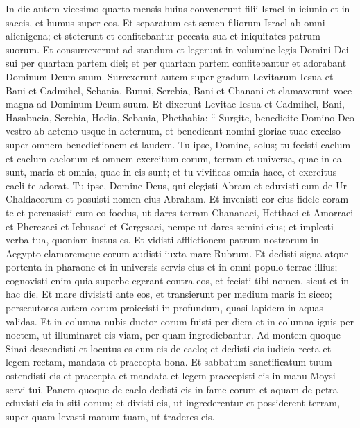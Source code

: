 \begin{biblechapter}
\begin{biblechapter}
\begin{biblechapter}
\begin{biblechapter}
\begin{biblechapter}
\begin{biblechapter}
\begin{biblechapter}
\begin{biblechapter}
\begin{biblechapter}
\verse In die autem vicesimo quarto mensis huius convenerunt filii Israel in ieiunio et in saccis, et humus super eos. 
\verse Et separatum est semen filiorum Israel ab omni alienigena; et steterunt et confitebantur peccata sua et iniquitates patrum suorum. 
\verse Et consurrexerunt ad standum et legerunt in volumine legis Domini Dei sui per quartam partem diei; et per quartam partem confitebantur et adorabant Dominum Deum suum. 
\verse Surrexerunt autem super gradum Levitarum Iesua et Bani et Cadmihel, Sebania, Bunni, Serebia, Bani et Chanani et clamaverunt voce magna ad Dominum Deum suum. 
\verse Et dixerunt Levitae Iesua et Cadmihel, Bani, Hasabneia, Serebia, Hodia, Sebania, Phethahia:
 “ Surgite, benedicite Domino Deo vestro
 ab aetemo usque in aeternum,
 et benedicant nomini gloriae tuae excelso
 super omnem benedictionem et laudem.
 \verse Tu ipse, Domine, solus;
 tu fecisti caelum et caelum caelorum
 et omnem exercitum eorum,
 terram et universa, quae in ea sunt, maria et omnia, quae in eis sunt;
 et tu vivificas omnia haec,
 et exercitus caeli te adorat.
 \verse Tu ipse, Domine Deus, qui elegisti Abram
 et eduxisti eum de Ur Chaldaeorum
 et posuisti nomen eius Abraham.
 \verse Et invenisti cor eius fidele coram te
 et percussisti cum eo foedus,
 ut dares terram Chananaei, Hetthaei et Amorraei
 et Pherezaei et Iebusaei et Gergesaei,
 nempe ut dares semini eius;
 et implesti verba tua,
 quoniam iustus es.
 \verse Et vidisti afflictionem patrum nostrorum in Aegypto
 clamoremque eorum audisti iuxta mare Rubrum.
 \verse Et dedisti signa atque portenta in pharaone
 et in universis servis eius et in omni populo terrae illius;
 cognovisti enim quia superbe egerant contra eos,
 et fecisti tibi nomen, sicut et in hac die.
 \verse Et mare divisisti ante eos,
 et transierunt per medium maris in sicco;
 persecutores autem eorum proiecisti in profundum,
 quasi lapidem in aquas validas.
 \verse Et in columna nubis ductor eorum fuisti per diem
 et in columna ignis per noctem,
 ut illuminaret eis viam, per quam ingrediebantur.
 \verse Ad montem quoque Sinai descendisti
 et locutus es cum eis de caelo;
 et dedisti eis iudicia recta
 et legem rectam, mandata et praecepta bona.
 \verse Et sabbatum sanctificatum tuum ostendisti eis
 et praecepta et mandata et legem praecepisti eis
 in manu Moysi servi tui.
 \verse Panem quoque de caelo dedisti eis in fame eorum
 et aquam de petra eduxisti eis in siti eorum;
 et dixisti eis, ut ingrederentur et possiderent terram,
 super quam levasti manum tuam, ut traderes eis.

\end{biblechapter}
\end{biblechapter}
\end{biblechapter}
\end{biblechapter}
\end{biblechapter}
\end{biblechapter}
\end{biblechapter}
\end{biblechapter}
\end{biblechapter}
